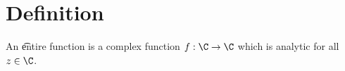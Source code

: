 

\section*{Definition}

An \t{entire function} is a complex function $f: \C  \to \C $ which is analytic for all $z \in \C $.

\blankpage